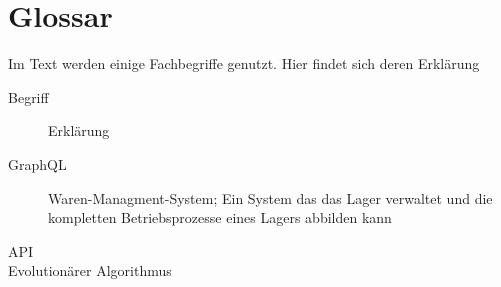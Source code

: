 \section{Glossar}

Im Text werden einige Fachbegriffe genutzt. Hier findet sich deren Erklärung

\begin{description}
    \item[Begriff] Erklärung
    \item[GraphQL] Waren-Managment-System; Ein System das das Lager verwaltet und die kompletten Betriebsprozesse eines Lagers abbilden kann
    \item[API]
    \item[Evolutionärer Algorithmus]
\end{description}

